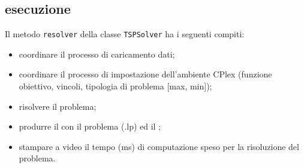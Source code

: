 \subsection[Esecuzione]{esecuzione}
\label{pt1:solver:esecution}
Il metodo \texttt{resolver} della classe \texttt{TSPSolver} ha i seguenti compiti:

\begin{itemize}
\item coordinare il processo di caricamento dati;
\item coordinare il processo di impostazione dell'ambiente CPlex (funzione obiettivo, vincoli, tipologia di problema [max, min]);
\item risolvere il problema;
\item produrre il  con il problema (.lp) ed il ;
\item stampare a video il tempo (ms) di computazione speso per la risoluzione del problema.
\end{itemize}